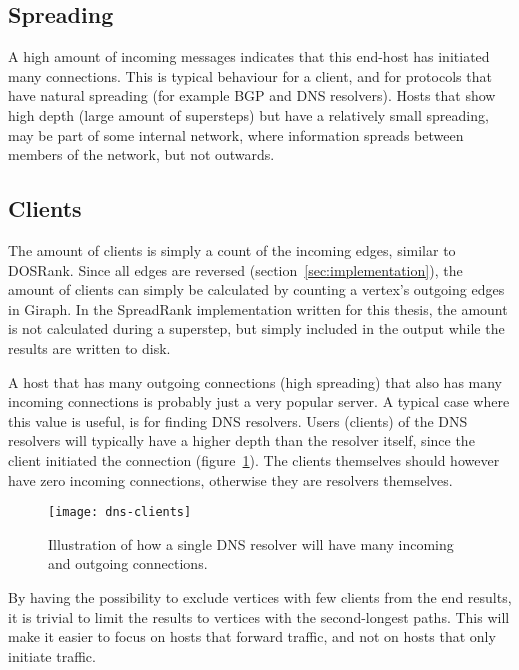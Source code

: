\subsection{Spreading}
A high amount of incoming messages indicates that this end-host has initiated many connections.
This is typical behaviour for a client, and for protocols that have natural spreading (for example BGP and DNS resolvers).
Hosts that show high depth (large amount of supersteps) but have a relatively small spreading,
 may be part of some internal network, where information spreads between members of the network, but not outwards.


\subsection{Clients}
The amount of clients is simply a count of the incoming edges, similar to DOSRank.
Since all edges are reversed (section~\ref{sec:implementation}),
 the amount of clients can simply be calculated by counting a vertex's outgoing edges in Giraph.
In the SpreadRank implementation written for this thesis,
 the amount is not calculated during a superstep, but simply included in the output while the results are written to disk.

A host that has many outgoing connections (high spreading) that also has many incoming connections is probably just a very popular server.
A typical case where this value is useful, is for finding DNS resolvers.
Users (clients) of the DNS resolvers will typically have a higher depth than the resolver itself,
 since the client initiated the connection (figure~\ref{fig:dns-clients}).
The clients themselves should however have zero incoming connections, otherwise they are resolvers themselves.

\begin{figure}[h!]
	\caption{Illustration of how a single DNS resolver will have many incoming and outgoing connections.}
	\label{fig:dns-clients}
	\centering
		\texttt{[image: dns-clients]}
\end{figure}

By having the possibility to exclude vertices with few clients from the end results,
 it is trivial to limit the results to vertices with the second-longest paths.
This will make it easier to focus on hosts that forward traffic, and not on hosts that only initiate traffic.

